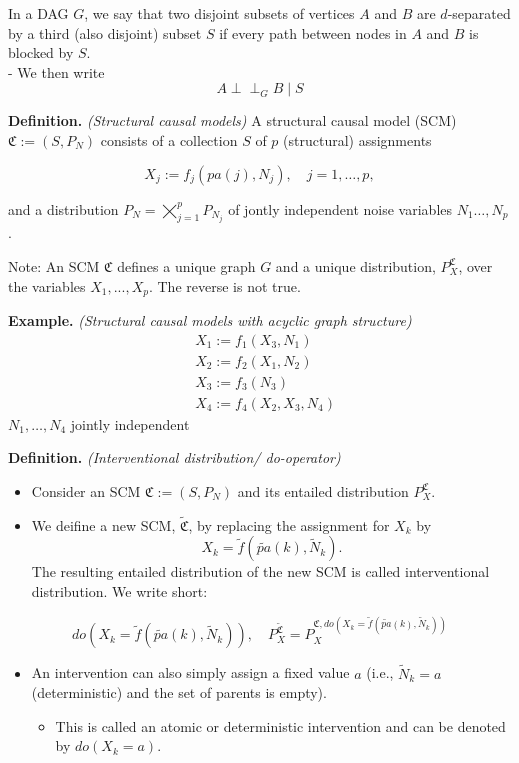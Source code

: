 \documentclass[a4paper,10pt,openany]{book}
\providecommand{\tightlist}{%
 \setlength{\itemsep}{0pt}\setlength{\parskip}{0pt}}
\begin{document}
In a DAG \(G\), we say that two disjoint subsets of vertices \(A\) and \(B\) are \(d\)-separated by a third (also disjoint) subset \(S\) if every path between nodes in \(A\) and \(B\) is blocked by \(S\).\\
- We then write
\[
    A \perp\!\!\!\!\perp_G B \mid S
    \]

\textbf{Definition.} \emph{(Structural causal models)} A structural causal model (SCM) \(\mathfrak{C}:=\left(S, P_N\right)\) consists of a collection \(S\) of \(p\) (structural) assignments

\[
X_j:=f_j\left(pa(j), N_j\right), \quad j=1, \ldots, p,
\]

and a distribution \(P_N=\bigtimes_{j=1}^p P_{N_j}\) of jontly independent noise variables \(N_1\dots,N_p\).

Note: An SCM \(\mathfrak{C}\) defines a unique graph \(G\) and a unique distribution, \(P^{\mathfrak{C}}_X\), over the variables \(X_1,...,X_p\). The reverse is not true.

\textbf{Example.} \emph{(Structural causal models with acyclic graph structure)}
\begin{align*}
& X_1:=f_1\left(X_3, N_1\right) \\
& X_2:=f_2\left(X_1, N_2\right) \\
& X_3:=f_3\left(N_3\right) \\
& X_4:=f_4\left(X_2, X_3, N_4\right)
\end{align*}
\(N_1, \ldots, N_4\) jointly independent

\textbf{Definition.} \emph{(Interventional distribution/ do-operator)}

\begin{itemize}
\item
  Consider an SCM \(\mathfrak C := (S,P_N)\) and its entailed distribution \(P^{\mathfrak C}_X\).
\item
  We deifine a new SCM, \(\tilde {\mathfrak C}\), by replacing the assignment for \(X_k\) by
  \[ 
  X_k = \tilde f(\tilde {pa}(k), \tilde N_k).
  \]
  The resulting entailed distribution of the new SCM is called interventional distribution.
  We write short:
\end{itemize}

\[
do(X_k = \tilde f(\tilde {pa}(k), \tilde N_k)), \quad P_X^{\tilde {\mathfrak C}}=P^{\mathfrak C, do(X_k = \tilde f(\tilde {pa}(k), \tilde N_k))}_X
\]

\begin{itemize}
\tightlist
\item
  An intervention can also simply assign a fixed value \(a\) (i.e., \(\tilde N_k=a\) (deterministic) and the set of parents is empty).

  \begin{itemize}
  \tightlist
  \item
    This is called an atomic or deterministic intervention and can be denoted by \(do(X_k = a)\).
  \end{itemize}
\end{itemize}
\end{document}
